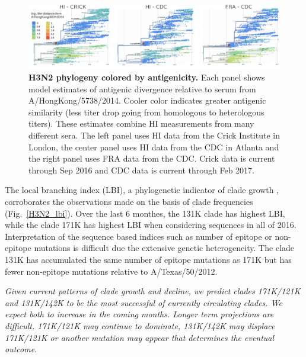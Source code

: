 \documentclass[11pt,oneside,letterpaper]{article}
\begin{document}
\begin{figure}[h!]
	\centering
	\includegraphics[width=1.0\textwidth]{../figures/feb-2017/H3N2_tree_titer_model.png}
	\caption{\textbf{H3N2 phylogeny colored by antigenicity.}
	Each panel shows model estimates of antigenic divergence relative to serum from A/HongKong/5738/2014.
	Cooler color indicates greater antigenic similarity (less titer drop going from homologous to heterologous titers).
	These estimates combine HI measurements from many different sera.
	The left panel uses HI data from the Crick Institute in London, the center panel uses HI data from the CDC in Atlanta and the right panel uses FRA data from the CDC.
	Crick data is current through Sep 2016 and CDC data is current through Feb 2017.
	}
	\label{H3N2_tree_titer_model}
\end{figure}

The local branching index (LBI), a phylogenetic indicator of clade growth \cite{neher2014predicting}, corroborates the observations made on the basis of clade frequencies (Fig.\ \ref{H3N2_lbi}).
Over the last 6 monthes, the 131K clade has highest LBI, while the clade 171K has highest LBI when considering sequences in all of 2016.
Interpretation of the sequence based indices such as number of epitope or non-epitope mutations \cite{luksza2014predictive} is difficult due the extensive genetic heterogeneity.
The clade 131K has accumulated the same number of epitope mutations as 171K but has fewer non-epitope mutations relative to A/Texas/50/2012.

 \textit{Given current patterns of clade growth and decline, we predict clades 171K/121K and 131K/142K to be the most successful of currently circulating clades. We expect both to increase in the coming months. Longer term projections are difficult. 171K/121K may continue to dominate, 131K/142K may displace 171K/121K or another mutation may appear that determines the eventual outcome.}
\end{document}
